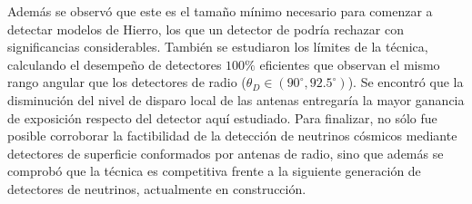 Adem\'as se observ\'o que este es el tama\~no m\'inimo necesario para comenzar a detectar modelos de Hierro, los que un detector de  podr\'ia rechazar con significancias considerables.
Tambi\'en se estudiaron los l\'imites de la t\'ecnica, calculando el desempe\~no de detectores $100\%$ eficientes que observan el mismo rango angular que los detectores de radio ($\theta_D\in(90^\circ,92.5^\circ)$).
Se encontr\'o que la disminuci\'on del nivel de disparo local de las antenas entregar\'ia la mayor ganancia de exposici\'on respecto del detector aqu\'i estudiado.
Para finalizar, no s\'olo fue posible corroborar la factibilidad de la detecci\'on de neutrinos c\'osmicos mediante detectores de superficie conformados por antenas de radio, sino que adem\'as se comprob\'o que la t\'ecnica es competitiva frente a la siguiente generaci\'on de detectores de neutrinos, actualmente en construcci\'on.
